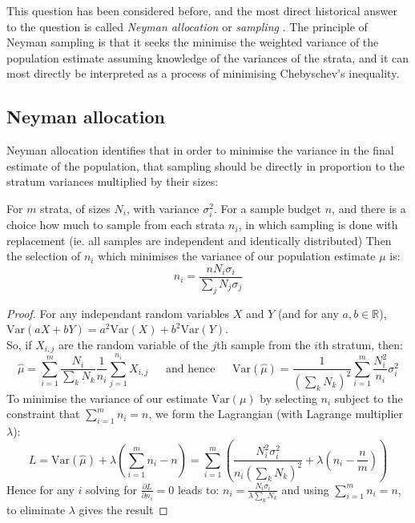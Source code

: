 This question has been considered before, and the most direct historical answer to the question is called \textit{Neyman allocation} or \textit{sampling} \cite{1938.10503378,10.2307/23339498}.
The principle of Neyman sampling is that it seeks the minimise the weighted variance of the population estimate assuming knowledge of the variances of the strata, and it can most directly be interpreted as a process of minimising Chebyschev's inequality.

\subsection{Neyman allocation}\label{sec:neyman_sampling}

Neyman allocation identifies that in order to minimise the variance in the final estimate of the population, that sampling should be directly in proportion to the stratum variances multiplied by their sizes:

\begin{theorem}\label{thm:neyman_selection}
For $m$ strata, of sizes $N_i$, with variance $\sigma_i^2$. For a sample budget $n$, and there is a choice how much to sample from each strata $n_i$, in which sampling is done with replacement (ie. all samples are independent and identically distributed)
Then the selection of $n_i$ which minimises the variance of our population estimate $\mu$ is:
$$n_i = \frac{nN_i\sigma_i}{\sum_jN_j\sigma_j}$$
\end{theorem}
\begin{proof}
For any independant random variables $X$ and $Y$ (and for any $a,b\in \mathbb{R}$), $\text{Var}(aX+bY) = a^2\text{Var}(X)+b^2\text{Var}(Y)$.\\
So, if $X_{i,j}$ are the random variable of the $j$th sample from the $i$th stratum, then:
\begin{equation}\label{eq:variance_decomposition_for_strata_mean} \hat{\mu} = \sum_{i=1}^m\frac{N_i}{\sum_kN_k}\frac{1}{n_i}\sum_{j=1}^{n_i}X_{i,j} ~~~~~~~\text{and hence}~~~~~~~\text{Var}(\hat{\mu}) = \frac{1}{\left(\sum_kN_k\right)^2} \sum_{i=1}^m\frac{N_i^2}{n_i}\sigma_i^2 \end{equation}
To minimise the variance of our estimate $\text{Var}(\mu)$ by selecting $n_i$ subject to the constraint that $\sum_{i=1}^m n_i = n$, we form the Lagrangian (with Lagrange multiplier $\lambda$):
$$L = \text{Var}(\hat{\mu}) + \lambda\left(\sum_{i=1}^mn_i-n\right) = \sum_{i=1}^m\left(\frac{N_i^2\sigma_i^2}{n_i\left(\sum_kN_k\right)^2} + \lambda \left(n_i-\frac{n}{m}\right)\right)$$
Hence for any $i$ solving for $\frac{\partial L}{\partial n_i}=0$ leads to:
$n_i = \frac{N_i\sigma_i}{\lambda\sum_kN_k}$ and using $\sum_{i=1}^m n_i = n$, to eliminate $\lambda$ gives the result
\end{proof}

